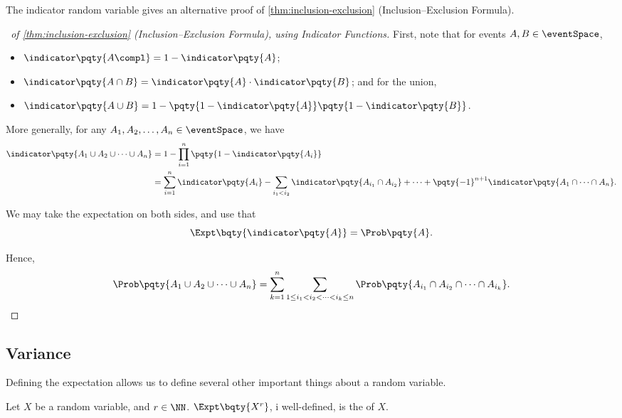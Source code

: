 The indicator random variable gives an alternative proof of \autoref{thm:inclusion-exclusion} (Inclusion--Exclusion Formula).

\begin{proof}[\proofname\ of \autoref{thm:inclusion-exclusion} (Inclusion--Exclusion Formula), using Indicator Functions]
    First, note that for events \(A, B \in \eventSpace\),
    \begin{itemize}
        \item \(\indicator\pqty{A\compl} = 1 - \indicator\pqty{A}\);
        \item \(\indicator\pqty{A \cap B} = \indicator\pqty{A} \cdot \indicator\pqty{B}\); and for the union,
        \item \(\indicator\pqty{A \cup B} = 1 - \pqty{1 - \indicator\pqty{A}} \pqty{1 - \indicator\pqty{B}}\).
    \end{itemize}

    More generally, for any \(A_1, A_2, \ldots, A_n \in \eventSpace\), we have
    \begin{align*}
        \indicator\pqty{A_1 \cup A_2 \cup \cdots \cup A_n} &= 1 - \prod_{i = 1}^{n} \pqty{1 - \indicator\pqty{A_i}} \\
        &= \sum_{i = 1}^{n} \indicator \pqty{A_i} - \sum_{i_1 < i_2} \indicator\pqty{A_{i_1} \cap A_{i_2}} + \cdots + \pqty{-1}^{n + 1} \indicator\pqty{A_1 \cap \cdots \cap A_n}.
    \end{align*}

    We may take the expectation on both sides, and use that
    \[
        \Expt\bqty{\indicator\pqty{A}} = \Prob\pqty{A}.
    \]

    Hence,
    \[
        \Prob\pqty{A_1 \cup A_2 \cup \cdots \cup A_n} = \sum_{k = 1}^{n} \sum_{1 \leq i_1 < i_2 < \cdots < i_k \leq n} \Prob\pqty{A_{i_1} \cap A_{i_2} \cap \cdots \cap A_{i_k}}.
    \]
\end{proof}

\subsection{Variance}

Defining the expectation allows us to define several other important things about a random variable.

\begin{definition}[Moment]
    \label{def:moment}%
    Let \(X\) be a random variable, and \(r \in \NN\). \(\Expt\bqty{X^r}\), i well-defined, is the  of \(X\).
\end{definition}

